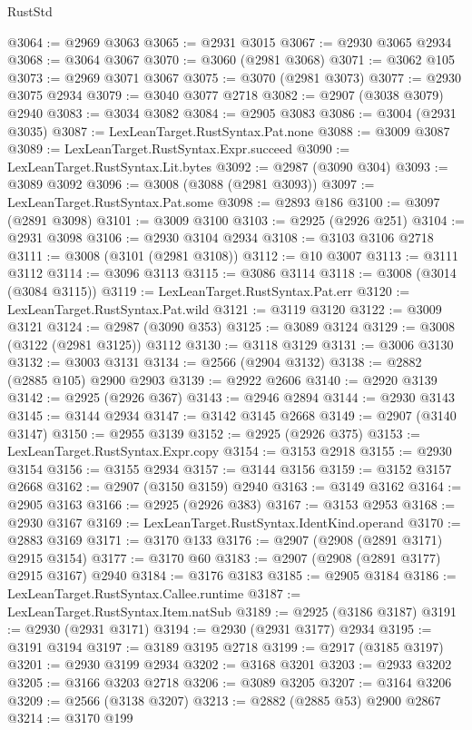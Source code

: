 \begin{lexlean}{RustStd}
\begin{coremodule}
@3064 := @2969 @3063
@3065 := @2931 @3015
@3067 := @2930 @3065 @2934
@3068 := @3064 @3067
@3070 := @3060 (@2981 @3068)
@3071 := @3062 @105
@3073 := @2969 @3071 @3067
@3075 := @3070 (@2981 @3073)
@3077 := @2930 @3075 @2934
@3079 := @3040 @3077 @2718
@3082 := @2907 (@3038 @3079) @2940
@3083 := @3034 @3082
@3084 := @2905 @3083
@3086 := @3004 (@2931 @3035)
@3087 := LexLeanTarget.RustSyntax.Pat.none
@3088 := @3009 @3087
@3089 := LexLeanTarget.RustSyntax.Expr.succeed
@3090 := LexLeanTarget.RustSyntax.Lit.bytes
@3092 := @2987 (@3090 @304)
@3093 := @3089 @3092
@3096 := @3008 (@3088 (@2981 @3093))
@3097 := LexLeanTarget.RustSyntax.Pat.some
@3098 := @2893 @186
@3100 := @3097 (@2891 @3098)
@3101 := @3009 @3100
@3103 := @2925 (@2926 @251)
@3104 := @2931 @3098
@3106 := @2930 @3104 @2934
@3108 := @3103 @3106 @2718
@3111 := @3008 (@3101 (@2981 @3108))
@3112 := @10 @3007
@3113 := @3111 @3112
@3114 := @3096 @3113
@3115 := @3086 @3114
@3118 := @3008 (@3014 (@3084 @3115))
@3119 := LexLeanTarget.RustSyntax.Pat.err
@3120 := LexLeanTarget.RustSyntax.Pat.wild
@3121 := @3119 @3120
@3122 := @3009 @3121
@3124 := @2987 (@3090 @353)
@3125 := @3089 @3124
@3129 := @3008 (@3122 (@2981 @3125)) @3112
@3130 := @3118 @3129
@3131 := @3006 @3130
@3132 := @3003 @3131
@3134 := @2566 (@2904 @3132)
@3138 := @2882 (@2885 @105) @2900 @2903
@3139 := @2922 @2606
@3140 := @2920 @3139
@3142 := @2925 (@2926 @367)
@3143 := @2946 @2894
@3144 := @2930 @3143
@3145 := @3144 @2934
@3147 := @3142 @3145 @2668
@3149 := @2907 (@3140 @3147)
@3150 := @2955 @3139
@3152 := @2925 (@2926 @375)
@3153 := LexLeanTarget.RustSyntax.Expr.copy
@3154 := @3153 @2918
@3155 := @2930 @3154
@3156 := @3155 @2934
@3157 := @3144 @3156
@3159 := @3152 @3157 @2668
@3162 := @2907 (@3150 @3159) @2940
@3163 := @3149 @3162
@3164 := @2905 @3163
@3166 := @2925 (@2926 @383)
@3167 := @3153 @2953
@3168 := @2930 @3167
@3169 := LexLeanTarget.RustSyntax.IdentKind.operand
@3170 := @2883 @3169
@3171 := @3170 @133
@3176 := @2907 (@2908 (@2891 @3171) @2915 @3154)
@3177 := @3170 @60
@3183 := @2907 (@2908 (@2891 @3177) @2915 @3167) @2940
@3184 := @3176 @3183
@3185 := @2905 @3184
@3186 := LexLeanTarget.RustSyntax.Callee.runtime
@3187 := LexLeanTarget.RustSyntax.Item.natSub
@3189 := @2925 (@3186 @3187)
@3191 := @2930 (@2931 @3171)
@3194 := @2930 (@2931 @3177) @2934
@3195 := @3191 @3194
@3197 := @3189 @3195 @2718
@3199 := @2917 (@3185 @3197)
@3201 := @2930 @3199 @2934
@3202 := @3168 @3201
@3203 := @2933 @3202
@3205 := @3166 @3203 @2718
@3206 := @3089 @3205
@3207 := @3164 @3206
@3209 := @2566 (@3138 @3207)
@3213 := @2882 (@2885 @53) @2900 @2867
@3214 := @3170 @199

\end{coremodule}
\end{lexlean}
